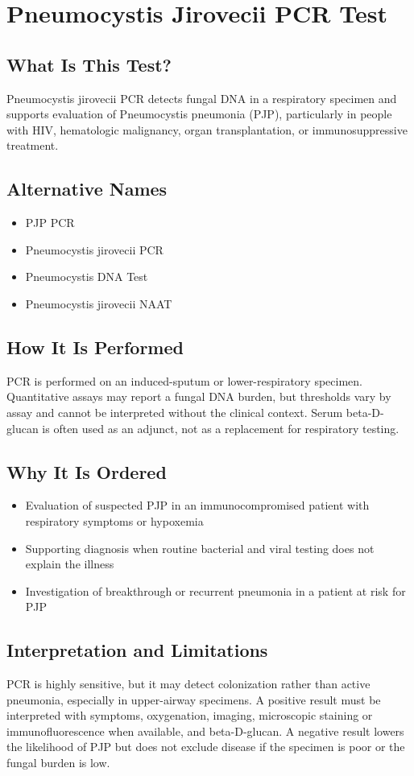 \chapter{Pneumocystis Jirovecii PCR Test}

\section*{What Is This Test?}
Pneumocystis jirovecii PCR detects fungal DNA in a respiratory specimen and supports evaluation of Pneumocystis pneumonia (PJP), particularly in people with HIV, hematologic malignancy, organ transplantation, or immunosuppressive treatment.

\section*{Alternative Names}
\begin{itemize}
  \item PJP PCR
  \item Pneumocystis jirovecii PCR
  \item Pneumocystis DNA Test
  \item Pneumocystis jirovecii NAAT
\end{itemize}
\section*{How It Is Performed}
PCR is performed on an induced-sputum or lower-respiratory specimen. Quantitative assays may report a fungal DNA burden, but thresholds vary by assay and cannot be interpreted without the clinical context. Serum beta-D-glucan is often used as an adjunct, not as a replacement for respiratory testing.

\section*{Why It Is Ordered}
\begin{itemize}
  \item Evaluation of suspected PJP in an immunocompromised patient with respiratory symptoms or hypoxemia
  \item Supporting diagnosis when routine bacterial and viral testing does not explain the illness
  \item Investigation of breakthrough or recurrent pneumonia in a patient at risk for PJP
\end{itemize}

\section*{Interpretation and Limitations}
PCR is highly sensitive, but it may detect colonization rather than active pneumonia, especially in upper-airway specimens. A positive result must be interpreted with symptoms, oxygenation, imaging, microscopic staining or immunofluorescence when available, and beta-D-glucan. A negative result lowers the likelihood of PJP but does not exclude disease if the specimen is poor or the fungal burden is low.
